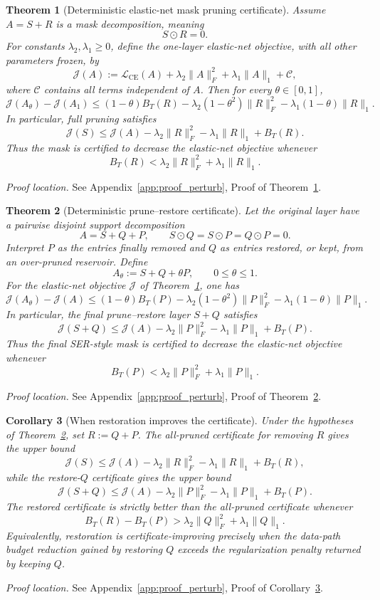 \documentclass[11pt]{article}
\theoremstyle{plain}
\newtheorem{thm}{Theorem}[section]
\newtheorem{cor}[thm]{Corollary}
\theoremstyle{definition}
\theoremstyle{remark}
\newcommand{\1}{\mathbf{1}}
\newcommand{\proofloc}[1]{\par\noindent\emph{Proof location.} #1\par}
\begin{document}
\begin{thm}[Deterministic elastic-net mask pruning certificate]
\label{thm:deterministic_mask_certificate}
Assume \(A=S+R\) is a mask decomposition, meaning
\[
S\odot R=0.
\]
For constants \(\lambda_2,\lambda_1\ge0\), define the one-layer elastic-net objective, with all other parameters frozen, by
\[
\mathcal J(A):=
\mathcal L_{\mathrm{CE}}(A)
+\lambda_2\|A\|_F^2
+\lambda_1\|A\|_1
+\mathcal C,
\]
where \(\mathcal C\) contains all terms independent of \(A\). Then for every \(\theta\in[0,1]\),
\[
\mathcal J(A_\theta)-\mathcal J(A_1)
\le
(1-\theta)B_T(R)
-\lambda_2(1-\theta^2)\|R\|_F^2
-\lambda_1(1-\theta)\|R\|_1.
\]
In particular, full pruning satisfies
\[
\mathcal J(S)
\le
\mathcal J(A)
-\lambda_2\|R\|_F^2
-\lambda_1\|R\|_1
+B_T(R).
\]
Thus the mask is certified to decrease the elastic-net objective whenever
\[
B_T(R)
<
\lambda_2\|R\|_F^2+\lambda_1\|R\|_1.
\]
\end{thm}
\proofloc{See Appendix~\ref{app:proof_perturb}, Proof of Theorem~\ref{thm:deterministic_mask_certificate}.}

\begin{thm}[Deterministic prune--restore certificate]
\label{thm:deterministic_prune_restore_certificate}
Let the original layer have a pairwise disjoint support decomposition
\[
A=S+Q+P,
\qquad
S\odot Q=S\odot P=Q\odot P=0.
\]
Interpret \(P\) as the entries finally removed and \(Q\) as entries restored, or kept, from an over-pruned reservoir. Define
\[
A_\theta:=S+Q+\theta P,\qquad 0\le\theta\le1.
\]
For the elastic-net objective \(\mathcal J\) of Theorem~\ref{thm:deterministic_mask_certificate}, one has
\[
\mathcal J(A_\theta)-\mathcal J(A)
\le
(1-\theta)B_T(P)
-\lambda_2(1-\theta^2)\|P\|_F^2
-\lambda_1(1-\theta)\|P\|_1.
\]
In particular, the final prune--restore layer \(S+Q\) satisfies
\[
\mathcal J(S+Q)
\le
\mathcal J(A)
-\lambda_2\|P\|_F^2
-\lambda_1\|P\|_1
+B_T(P).
\]
Thus the final SER-style mask is certified to decrease the elastic-net objective whenever
\[
B_T(P)<\lambda_2\|P\|_F^2+\lambda_1\|P\|_1.
\]
\end{thm}
\proofloc{See Appendix~\ref{app:proof_perturb}, Proof of Theorem~\ref{thm:deterministic_prune_restore_certificate}.}

\begin{cor}[When restoration improves the certificate]
\label{cor:restoration_improves_certificate}
Under the hypotheses of Theorem~\ref{thm:deterministic_prune_restore_certificate}, set \(R:=Q+P\). The all-pruned certificate for removing \(R\) gives the upper bound
\[
\mathcal J(S)
\le
\mathcal J(A)
-\lambda_2\|R\|_F^2
-\lambda_1\|R\|_1
+B_T(R),
\]
while the restore-\(Q\) certificate gives the upper bound
\[
\mathcal J(S+Q)
\le
\mathcal J(A)
-\lambda_2\|P\|_F^2
-\lambda_1\|P\|_1
+B_T(P).
\]
The restored certificate is strictly better than the all-pruned certificate whenever
\[
B_T(R)-B_T(P)
>
\lambda_2\|Q\|_F^2+\lambda_1\|Q\|_1.
\]
Equivalently, restoration is certificate-improving precisely when the data-path budget reduction gained by restoring \(Q\) exceeds the regularization penalty returned by keeping \(Q\).
\end{cor}
\proofloc{See Appendix~\ref{app:proof_perturb}, Proof of Corollary~\ref{cor:restoration_improves_certificate}.}
\end{document}
